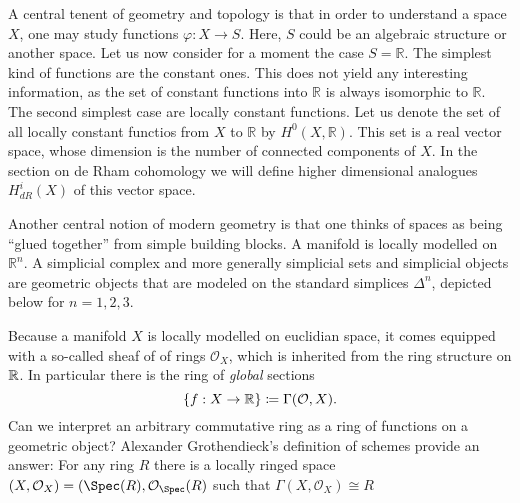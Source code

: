 A central tenent of geometry and topology is that in order to understand a space $X$, one may study functions $\varphi: X \to S$. Here, $S$ could be an algebraic structure or another space. Let us now consider for a moment the case $S=\mathbb{R}$. The simplest kind of functions are the constant ones. This does not yield any interesting information, as the set of constant functions into $\mathbb{R}$ is always isomorphic to $\mathbb{R}$. The second simplest case are locally constant functions. Let us denote the set of all locally constant functios from $X$ to $\mathbb{R}$ by $H^0(X,\mathbb{R})$. This set is a real vector space, whose dimension is the number of connected components of $X$. In the section on de Rham cohomology we will define higher dimensional analogues $H^i_{dR}(X)$ of this vector space.

Another central notion of modern geometry is that one thinks of spaces as being “glued together” from simple building blocks. A manifold is locally modelled on $\mathbb{R}^n$. A simplicial complex and more generally simplicial sets and simplicial objects are geometric objects that are modeled on the standard simplices $\Delta^n$, depicted below for $n = 1,2,3$.


Because a manifold $X$ is locally modelled on euclidian space, it comes equipped with a so-called sheaf of of rings $\mathcal{O}_X$, which is inherited from the ring structure on $\mathbb{R}$. In particular there is the ring of \textit{global} sections
\[\{f: X \to \mathbb{R} \} \coloneqq  \Gamma(\mathcal{O}, X).\]
Can we interpret an arbitrary commutative ring as a ring of functions on a geometric object?
Alexander Grothendieck's definition of schemes provide an answer: For any ring $R$ there is a locally ringed space $(X, \mathcal{O}_X) = (\Spec(R), \mathcal{O}_\Spec(R)$ such that $\Gamma(X, \mathcal{O}_X) \cong R$
